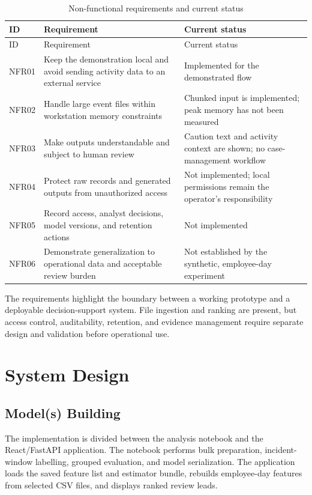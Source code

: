 \documentclass[12pt,a4paper,oneside]{report}
\begin{document}
\begin{longtable}{|p{}|p{}|p{}|}
\caption{Non-functional requirements and current status}
\label{tab:nonfunctional-requirements}\\
\hline
ID & Requirement & Current status\\
\hline
\endfirsthead
\hline
ID & Requirement & Current status\\
\hline
\endhead
NFR01 & Keep the demonstration local and avoid sending activity data to an external service & Implemented for the demonstrated flow\\
\hline
NFR02 & Handle large event files within workstation memory constraints & Chunked input is implemented; peak memory has not been measured\\
\hline
NFR03 & Make outputs understandable and subject to human review & Caution text and activity context are shown; no case-management workflow\\
\hline
NFR04 & Protect raw records and generated outputs from unauthorized access & Not implemented; local permissions remain the operator's responsibility\\
\hline
NFR05 & Record access, analyst decisions, model versions, and retention actions & Not implemented\\
\hline
NFR06 & Demonstrate generalization to operational data and acceptable review burden & Not established by the synthetic, employee-day experiment\\
\hline
\end{longtable}

The requirements highlight the boundary between a working prototype
and a deployable decision-support system. File ingestion and ranking
are present, but access control, auditability, retention, and evidence
management require separate design and validation before operational
use.

\chapter{System Design}
\section{Model(s) Building}
The implementation is divided between the analysis notebook and the
React/FastAPI application. The notebook performs bulk preparation,
incident-window labelling, grouped evaluation, and model serialization.
The application loads the saved feature list and estimator bundle,
rebuilds employee-day features from selected CSV files, and displays
ranked review leads.
\end{document}
